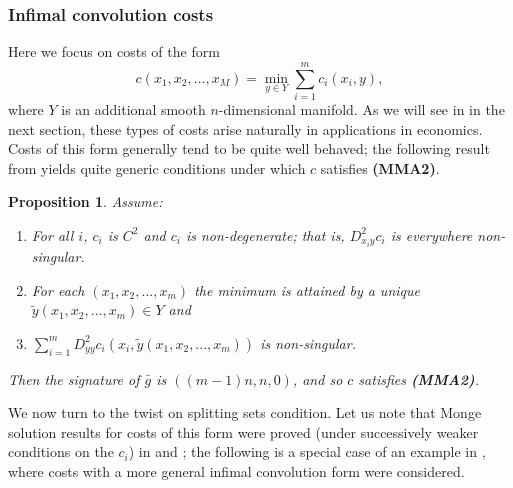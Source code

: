 \documentclass[letter,10pt]{article}
\theoremstyle{dotless}
\begin{document}
\subsubsection{Infimal convolution costs}\label{infcon}
Here we focus on costs of the form 
\begin{equation}\label{infconcost}
c(x_1,x_2,...,x_M) =\min_{y \in Y}\sum_{i=1}^mc_i(x_i,y),
\end{equation}
where $Y$ is an additional smooth $n$-dimensional manifold.  As we will see in in the next section, these types of costs arise naturally in applications in economics.  Costs of this form generally tend to be quite well behaved; the following result from \cite{P} yields quite generic conditions under which $c$ satisfies \textbf{(MMA2)}.

\newtheorem{infcostnondeg}[radial]{Proposition}
\begin{infcostnondeg}
Assume:
\begin{enumerate}
\item For all $i$,  $c_i$ is $C^{2}$ and $c_i$ is non-degenerate; that is, $D^{2}_{x_iy}c_i$  is everywhere non-singular.
\item For each $(x_1,x_2,...,x_m)$ the minimum is attained by a unique $\tilde y(x_1,x_2,...,x_m) \in Y$ and
\item $\sum_{i=1}^m D^2_{yy}c_i(x_i,\tilde y(x_1,x_2,...,x_m))$ is non-singular.  
\end{enumerate}
Then the signature of $\bar{g}$ is $((m-1)n,n,0)$, and so $c$ satisfies \textbf{(MMA2)}.
\end{infcostnondeg}
We now turn to the twist on splitting sets condition.  Let us note that Monge solution results for costs of this form were proved (under successively weaker conditions on the $c_i$) in \cite{P1} \cite{P13a} and \cite{KP2}; the following is a special case of an example in \cite{KP2}, where costs with a more general infimal convolution form were considered.
\end{document}
